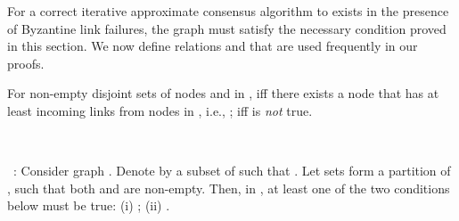 \documentclass{llncs}
\begin{document}
For a correct iterative approximate consensus algorithm to exists in the presence of Byzantine link failures, the graph  must satisfy the necessary condition proved in this section.
We now define relations 
and  that are used frequently in our proofs.

\begin{definition}
\label{def:absorb}
For non-empty disjoint sets of nodes  and  in ,  iff there exists a node  that has at least  incoming links from nodes in , i.e., ;  iff  is {\em not} true.






\end{definition}

~

~: Consider graph . Denote by  a subset of  such that .
Let sets  form a partition of , such that
both  and  are non-empty. Then, in , at least one of the two conditions below must be true: (i) ; (ii) .
\end{document}
